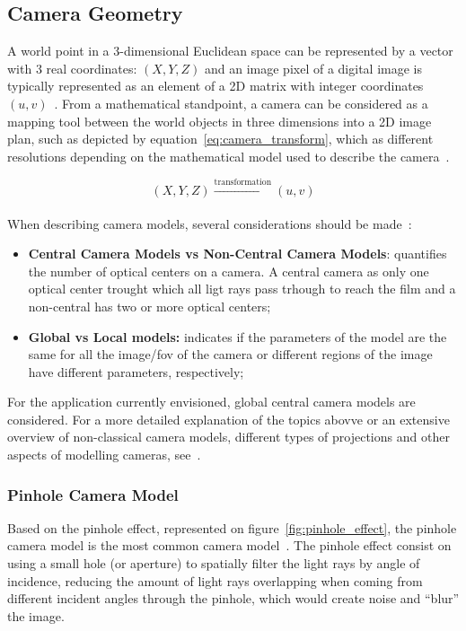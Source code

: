 \subsection{Camera Geometry}
A world point in a 3-dimensional Euclidean space can be represented by a vector with 3 real coordinates: $(X, Y, Z)$ and an image pixel of a digital image is typically represented as an element of a 2D matrix with integer coordinates $(u, v)$~\cite{mvg_book}. From a mathematical standpoint, a camera can be considered as a mapping tool between the world objects in three dimensions into a 2D image plan, such as depicted by equation~\ref{eq:camera_transform}, which as different resolutions depending on the mathematical model used to describe the camera~\cite{mvg_book, Sturm2010}.

\begin{equation}
	\label{eq:camera_transform}
	(X, Y, Z) \xrightarrow[]{\text{transformation}} (u, v)
\end{equation}

When describing camera models, several considerations should be made~\cite{Sturm2010}:
\begin{itemize}
	\item \textbf{Central Camera Models vs Non-Central Camera Models}: quantifies the number of optical centers on a camera. A central camera as only one optical center trought which all ligt rays pass trhough to reach the film and a non-central has two or more optical centers;
	\item \textbf{Global vs Local models:} indicates if the parameters of the model are the same for all the image/\ac{fov} of the camera or different regions of the image have different parameters, respectively;
\end{itemize}

For the application currently envisioned, global central camera models are considered. For a more detailed explanation of the topics abovve or an extensive overview of non-classical camera models, different types of projections and other aspects of modelling cameras, see~\cite{Sturm2010, camera_models}.

\subsubsection{Pinhole Camera Model}
Based on the pinhole effect, represented on figure~\ref{fig:pinhole_effect}, the pinhole camera model is the most common camera model~\cite{camera_model}. The pinhole effect consist on using a small hole (or aperture) to spatially filter the light rays by angle of incidence, reducing the amount of light rays overlapping when coming from different incident angles through the pinhole, which would create noise and ``blur'' the image. 

